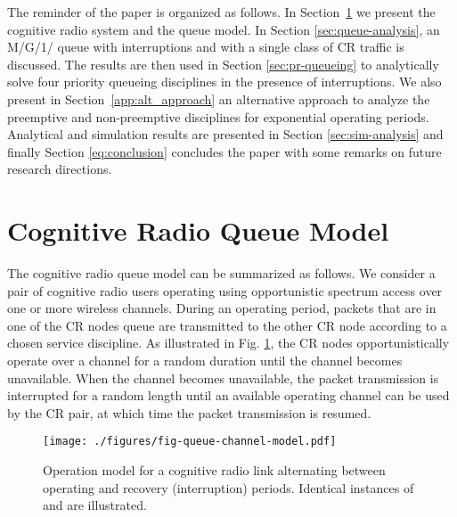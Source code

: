 \documentclass[11pt,journal,oneside,onecolumn,draftclsnofoot]{IEEEtran}
\begin{document}
The reminder of the paper is organized as follows. In Section~\ref{sec:queue-model} we present the cognitive radio system and the queue model. In Section \ref{sec:queue-analysis}, an M/G/1/ queue with interruptions and with a single class of CR traffic is discussed. The results are then used in Section \ref{sec:pr-queueing} to analytically solve four priority queueing disciplines in the presence of interruptions. We also present in Section~\ref{app:alt_approach} an alternative approach to analyze the preemptive and non-preemptive disciplines for exponential operating periods.
Analytical and simulation results are presented in Section \ref{sec:sim-analysis} and finally Section \ref{eq:conclusion} concludes the paper with some remarks on future research directions. 


\section{Cognitive Radio Queue Model}
\label{sec:queue-model}

The cognitive radio queue model can be summarized as follows. We consider a pair of cognitive radio users operating using opportunistic spectrum access over one or more wireless channels. During an operating period, packets that are in one of the CR nodes queue are transmitted to the other CR node according to a chosen service discipline. As illustrated in Fig. \ref{fig-queue-channel-model}, the CR nodes opportunistically operate over a channel for a random duration  until the channel becomes unavailable. When the channel becomes unavailable, the packet transmission is interrupted for a random length  until an available operating channel can be used by the CR pair, at which time the packet transmission is resumed.
\begin{figure}\texttt{[image: ./figures/fig-queue-channel-model.pdf]}\caption{Operation model for a cognitive radio link alternating between operating and recovery (interruption) periods. Identical instances of  and  are illustrated.}\label{fig-queue-channel-model}\end{figure}
\end{document}
